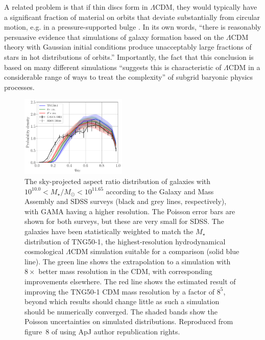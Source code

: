\documentclass[fleqn,usenatbib,useAMS]{mnras} %
\begin{document}
A related problem is that if thin discs form in $\Lambda$CDM, they would typically have a significant fraction of material on orbits that deviate substantially from circular motion, e.g. in a pressure-supported bulge \citep{Peebles_2020}. In its own words, ``there is reasonably persuasive evidence that simulations of galaxy formation based on the $\Lambda$CDM theory with Gaussian initial conditions produce unacceptably large fractions of stars in hot distributions of orbits.'' Importantly, the fact that this conclusion is based on many different simulations ``suggests this is characteristic of $\Lambda$CDM in a considerable range of ways to treat the complexity'' of subgrid baryonic physics processes.

\begin{figure}
	\centering
	\includegraphics[width=0.45\textwidth]{TNG50_aspect_ratio_quadratic_extrapolation_Ms1000_1165}
	\caption{The sky-projected aspect ratio distribution of galaxies with $10^{10.0} < M_{\star}/M_\odot < 10^{11.65}$ according to the Galaxy and Mass Assembly \citep[GAMA;][]{Driver_2009, Driver_2011} and SDSS surveys (black and grey lines, respectively), with GAMA having a higher resolution. The Poisson error bars are shown for both surveys, but these are very small for SDSS. The galaxies have been statistically weighted to match the $M_{\star}$ distribution of TNG50-1, the highest-resolution hydrodynamical cosmological $\Lambda$CDM simulation suitable for a comparison (solid blue line). The green line shows the extrapolation to a simulation with $8\times$ better mass resolution in the CDM, with corresponding improvements elsewhere. The red line shows the estimated result of improving the TNG50-1 CDM mass resolution by a factor of $8^5$, beyond which results should change little as such a simulation should be numerically converged. The shaded bands show the Poisson uncertainties on simulated distributions. Reproduced from figure~8 of \citet{Haslbauer_2022} using ApJ author republication rights.}
	\label{TNG50_aspect_ratio_quadratic_extrapolation_Ms1000_1165}
\end{figure}
\end{document}
